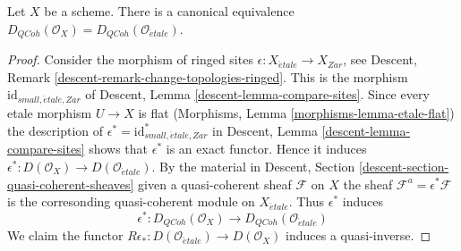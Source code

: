 \begin{lemma}
\label{lemma-derived-quasi-coherent-small-etale-site}
Let $X$ be a scheme. There is a canonical equivalence
$D_{QCoh}(\mathcal{O}_X) = D_{QCoh}(\mathcal{O}_{\acute{e}tale})$.
\end{lemma}

\begin{proof}
Consider the morphism of ringed sites
$\epsilon : X_{\acute{e}tale} \to X_{Zar}$, see
Descent, Remark \ref{descent-remark-change-topologies-ringed}.
This is the morphism $\text{id}_{small, \acute{e}tale, Zar}$ of
Descent, Lemma \ref{descent-lemma-compare-sites}.
Since every etale morphism $U \to X$ is flat
(Morphisms, Lemma \ref{morphisms-lemma-etale-flat})
the description of $\epsilon^* = \text{id}_{small, \acute{e}tale, Zar}^*$ in
Descent, Lemma \ref{descent-lemma-compare-sites}
shows that $\epsilon^*$ is an exact functor. Hence it induces
$\epsilon^* : D(\mathcal{O}_X) \to D(\mathcal{O}_{\acute{e}tale})$.
By the material in
Descent, Section \ref{descent-section-quasi-coherent-sheaves}
given a quasi-coherent sheaf $\mathcal{F}$ on $X$ the sheaf
$\mathcal{F}^a = \epsilon^*\mathcal{F}$ is the corresonding quasi-coherent
module on $X_{\acute{e}tale}$. Thus $\epsilon^*$ induces
$$
\epsilon^* : D_{QCoh}(\mathcal{O}_X) \to D_{QCoh}(\mathcal{O}_{\acute{e}tale})
$$
We claim the functor $R\epsilon_* : D(\mathcal{O}_{\acute{e}tale}) \to
D(\mathcal{O}_X)$ induces a quasi-inverse.


\end{proof}
